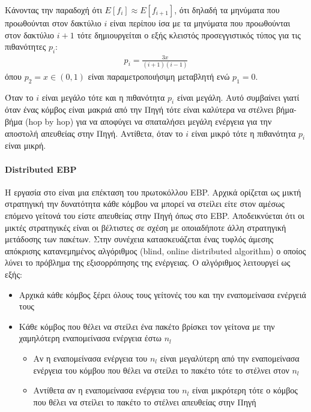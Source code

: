Κάνοντας την παραδοχή ότι $E[f_{i}] \approx E[f_{i+1}]$, ότι δηλαδή τα μηνύματα που προωθούνται στον δακτύλιο $i$ είναι περίπου ίσα με τα μηνύματα που προωθούνται
στον δακτύλιο $i+1$ τότε δημιουργείται ο εξής κλειστός προσεγγιστικός τύπος για τις πιθανότητες $p_{i}$:
\begin{align*}
p_{i} = \frac{3x}{(i+1)(i-1)}
\end{align*}
όπου $p_{2} = x \in (0,1)$ είναι παραμετροποιήσιμη μεταβλητή ενώ $p_{1} =0$.

Όταν το $i$ είναι μεγάλο τότε και η πιθανότητα $p_{i}$ είναι μεγάλη. Αυτό συμβαίνει γιατί όταν ένας κόμβος είναι μακριά από την Πηγή τότε είναι
καλύτερα να στέλνει βήμα-βήμα (hop by hop) για να αποφύγει να σπαταλήσει μεγάλη ενέργεια για την αποστολή απευθείας στην Πηγή. Αντίθετα, όταν το $i$ είναι μικρό τότε
η πιθανότητα $p_{i}$ είναι μικρή.

\paragraph{Distributed EBP} Η εργασία στο \cite{debp_protocol} είναι μια επέκταση του πρωτοκόλλου EBP. Αρχικά
ορίζεται ως μικτή στρατηγική την δυνατότητα κάθε κόμβου να μπορεί να στείλει είτε στον αμέσως επόμενο γείτονά του είστε απευθείας στην Πηγή όπως στο EBP.
Αποδεικνύεται ότι οι μικτές στρατηγικές είναι οι βέλτιστες σε σχέση με οποιαδήποτε άλλη στρατηγική μετάδοσης των πακέτων. Στην συνέχεια κατασκευάζεται ένας τυφλός
άμεσης απόκρισης κατανεμημένος αλγόριθμος (blind, online distributed algorithm) ο οποίος λύνει το πρόβλημα της εξισορρόπησης της ενέργειας. Ο αλγόριθμος λειτουργεί ως
εξής:
\begin{itemize}
\item Αρχικά κάθε κόμβος ξέρει όλους τους γείτονές του και την εναπομείνασα ενέργειά τους
\item Κάθε κόμβος που θέλει να στείλει ένα πακέτο βρίσκει τον γείτονα με την χαμηλότερη εναπομείνασα ενέργεια έστω $n_{l}$
	\begin{itemize}
	\item Αν η εναπομείνασα ενέργεια του $n_{l}$ είναι μεγαλύτερη από την εναπομείνασα ενέργεια του κόμβου που θέλει να στείλει το πακέτο τότε το στέλνει στον
$n_{l}$
	\item Αντίθετα αν η εναπομείνασα ενέργεια του $n_{l}$ είναι μικρότερη τότε ο κόμβος που θέλει να στείλει το πακέτο το στέλνει απευθείας στην Πηγή
	\end{itemize}
\end{itemize}

